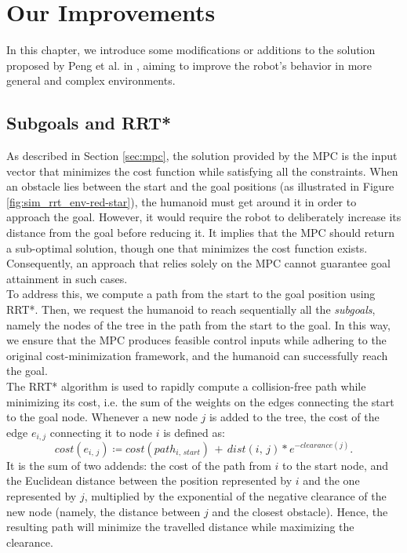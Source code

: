 \section{Our Improvements}\label{sec:improvements}

In this chapter, we introduce some modifications or additions to the solution proposed by Peng et al. in \cite{peng_main_paper}, aiming to improve the robot's behavior in more general and complex environments.

\subsection{Subgoals and RRT*}
As described in Section \ref{sec:mpc}, the solution provided by the MPC is the input vector that minimizes the cost function while satisfying all the constraints. When an obstacle lies between the start and the goal positions (as illustrated in Figure \ref{fig:sim_rrt_env-red-star}), the humanoid must get around it in order to approach the goal. However, it would require the robot to deliberately increase its distance from the goal before reducing it. It implies that the MPC should return a sub-optimal solution, though one that minimizes the cost function exists. Consequently, an approach that relies solely on the MPC cannot guarantee goal attainment in such cases.\\
To address this, we compute a path from the start to the goal position using RRT*. Then, we request the humanoid to reach sequentially all the \textit{subgoals}, namely the nodes of the tree in the path from the start to the goal. In this way, we ensure that the MPC produces feasible control inputs while adhering to the original cost-minimization framework, and the humanoid can successfully reach the goal.\\
The RRT* algorithm is used to rapidly compute a collision-free path while minimizing its cost, i.e. the sum of the weights on the edges connecting the start to the goal node. Whenever a new node $j$ is added to the tree, the cost of the edge $e_{i,j}$ connecting it to node $i$ is defined as:
$$ cost(e_{i,\, j}) \coloneqq  cost(path_{i,\,start})\, +\,dist(i,\, j) * e^{-clearance(j)}. $$
It is the sum of two addends: the cost of the path from $i$ to the start node, and the Euclidean distance between the position represented by $i$ and the one represented by $j$, multiplied by the exponential of the negative clearance of the new node (namely, the distance between $j$ and the closest obstacle). Hence, the resulting path will minimize the travelled distance while maximizing the clearance.

